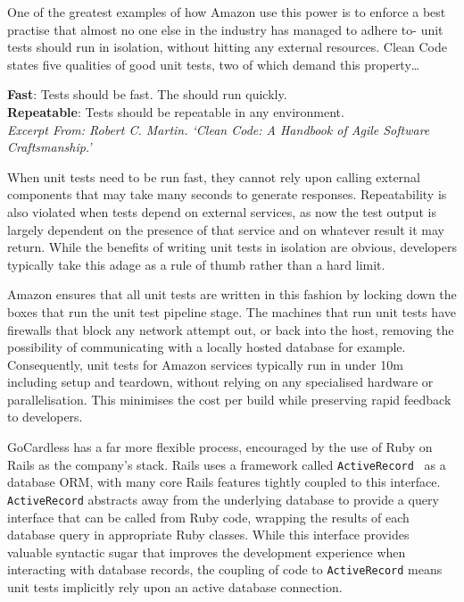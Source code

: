 \documentclass[11pt]{article}
\begin{document}
One of the greatest examples of how Amazon use this power is to enforce a best
practise that almost no one else in the industry has managed to adhere to- unit
tests should run in isolation, without hitting any external resources. Clean
Code~\cite{cleanCode} states five qualities of good unit tests, two of which
demand this property\dots

\begin{displayquote}

  \textbf{Fast}: Tests should be fast. The should run quickly. \\
  \textbf{Repeatable}: Tests should be repeatable in any environment. \\

  \textit{Excerpt From: Robert C. Martin. `Clean Code: A Handbook of Agile
  Software Craftsmanship.'}

\end{displayquote}

When unit tests need to be run fast, they cannot rely upon calling external
components that may take many seconds to generate responses. Repeatability is
also violated when tests depend on external services, as now the test output is
largely dependent on the presence of that service and on whatever result it may
return. While the benefits of writing unit tests in isolation are obvious,
developers typically take this adage as a rule of thumb rather than a hard
limit.

Amazon ensures that all unit tests are written in this fashion by locking down
the boxes that run the unit test pipeline stage. The machines that run unit
tests have firewalls that block any network attempt out, or back into the host,
removing the possibility of communicating with a locally hosted database for
example. Consequently, unit tests for Amazon services typically run in under 10m
including setup and teardown, without relying on any specialised hardware or
parallelisation. This minimises the cost per build while preserving rapid
feedback to developers.

GoCardless has a far more flexible process, encouraged by the use of Ruby on
Rails as the company's stack. Rails uses a framework called
\texttt{ActiveRecord}~\cite{activeRecord} as a database ORM, with many core
Rails features tightly coupled to this interface. \texttt{ActiveRecord}
abstracts away from the underlying database to provide a query interface that
can be called from Ruby code, wrapping the results of each database query in
appropriate Ruby classes.  While this interface provides valuable syntactic
sugar that improves the development experience when interacting with database
records, the coupling of code to \texttt{ActiveRecord} means unit tests
implicitly rely upon an active database connection.
\end{document}
